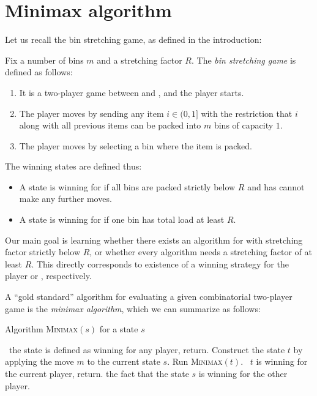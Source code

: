\section{Minimax algorithm}\label{sec:4:minimax}
Let us recall the bin stretching game, as defined in the introduction:

\begin{dfn}
Fix a number of bins $m$ and a stretching factor $R$. The \emph{bin stretching game}
is defined as follows:

\begin{enumerate}
\item It is a two-player game between \algo and \adversary, and the player \adversary starts.
\item The player \adversary moves by sending any item $i \in (0,1]$ with the restriction
that $i$ along with all previous items can be packed into $m$ bins of capacity $1$.
\item The player \algo moves by selecting a bin where the item is packed.
\end{enumerate}

The winning states are defined thus:
\begin{itemize}
\item A state is winning for \algo if all bins are packed strictly below $R$ and \adversary
has cannot make any further moves.
\item A state is winning for \adversary if one bin has total load at least $R$.
\end{itemize}
\end{dfn}

Our main goal is learning whether there exists an algorithm for
\binstretch with stretching factor strictly below $R$, or whether
every algorithm needs a stretching factor of at least $R$. This
directly corresponds to existence of a winning strategy for the player
\algo or \adversary, respectively.

A ``gold standard'' algorithm for evaluating a given combinatorial
two-player game is the \emph{minimax algorithm}, which we can
summarize as follows:

\begin{algorithm}
\caption{Algorithm \textsc{Minimax}$(s)$ for a state $s$}
\begin{algorithmic}[1]
\State \algorithmicif\ the state is defined as winning for any player, return.
\State Construct the state $t$ by applying the move $m$ to the current state $s$.
\State Run \textsc{Minimax}$(t)$.
\State \algorithmicif\ $t$ is winning for the current player, return.
\EndFor
\State \Return the fact that the state $s$ is winning for the other player.
\end{algorithmic}
\end{algorithm}


